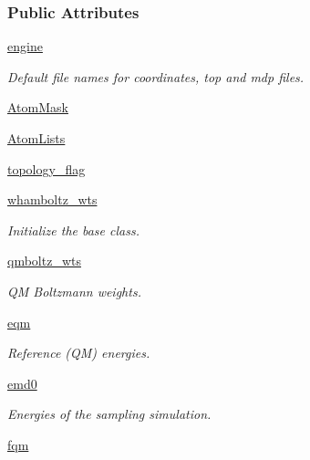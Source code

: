 \subsubsection*{Public Attributes}
\begin{DoxyCompactItemize}
\item 
\hyperlink{classforcebalance_1_1gmxio_1_1AbInitio__GMX_a3a8e9fb9ebb663f176981314855db794}{engine}
\begin{DoxyCompactList}\small\item\em Default file names for coordinates, top and mdp files. \end{DoxyCompactList}\item 
\hyperlink{classforcebalance_1_1gmxio_1_1AbInitio__GMX_a1ba04a104c0a2e1bafdf3281c95bac72}{Atom\-Mask}
\item 
\hyperlink{classforcebalance_1_1gmxio_1_1AbInitio__GMX_a802fa83fad6f5a7caa5de1cfb21f7662}{Atom\-Lists}
\item 
\hyperlink{classforcebalance_1_1gmxio_1_1AbInitio__GMX_a4ad28e81af854bc33e671224c5f26fca}{topology\-\_\-flag}
\item 
\hyperlink{classforcebalance_1_1abinitio_1_1AbInitio_a885e7ef58b9e7c6abbc24321e5f3c61a}{whamboltz\-\_\-wts}
\begin{DoxyCompactList}\small\item\em Initialize the base class. \end{DoxyCompactList}\item 
\hyperlink{classforcebalance_1_1abinitio_1_1AbInitio_a06ec6b12d81791ca94f599f41e56335a}{qmboltz\-\_\-wts}
\begin{DoxyCompactList}\small\item\em Q\-M Boltzmann weights. \end{DoxyCompactList}\item 
\hyperlink{classforcebalance_1_1abinitio_1_1AbInitio_a64387fae9bdfb0d03ca6961e67c779be}{eqm}
\begin{DoxyCompactList}\small\item\em Reference (Q\-M) energies. \end{DoxyCompactList}\item 
\hyperlink{classforcebalance_1_1abinitio_1_1AbInitio_af928d333d14cb3b93f7db78530455873}{emd0}
\begin{DoxyCompactList}\small\item\em Energies of the sampling simulation. \end{DoxyCompactList}\item 
\hyperlink{classforcebalance_1_1abinitio_1_1AbInitio_af025be2ce97da3e8dc876d70e403f4ef}{fqm}

\end{DoxyCompactItemize}
